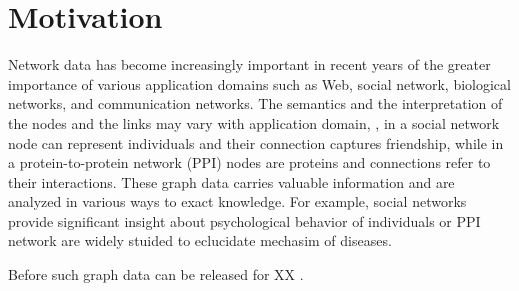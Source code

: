 \section{Motivation}
\label{sec:motivation}

Network data has become increasingly important in recent years of the greater importance of various application domains such as Web, social network, biological networks, and communication networks. The semantics and the interpretation of the nodes and the links may vary with application domain, {\eg}, in a social network node can represent individuals and their connection captures friendship, while in a protein-to-protein network (PPI) nodes are proteins and connections refer to their interactions. These graph data carries valuable information and are analyzed in various ways to exact knowledge. For example, social networks provide significant insight about psychological behavior of individuals or PPI network are widely stuided to eclucidate mechasim of diseases. 

Before such graph data can be released for XX . 